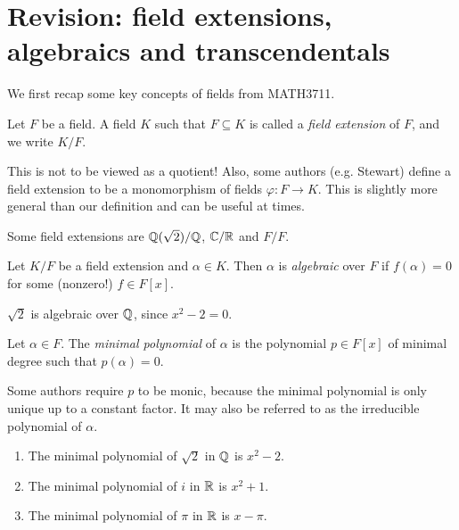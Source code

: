 \chapter{Revision: field extensions, algebraics and transcendentals}

We first recap some key concepts of fields from MATH3711.

\begin{definition}
    Let $F$ be a field. A field $K$ such that $F \subseteq K$ is called a \emph{field extension} of $F$, and we write $K/F$.
\end{definition}

\begin{remark}
    This is not to be viewed as a quotient! Also, some authors (e.g. Stewart) define a field extension to be a monomorphism of fields $\varphi: F \to K$. This is slightly more general than our definition and can be useful at times.
\end{remark}

\begin{example}
    Some field extensions are $\mathbb{{Q}}(\sqrt{2})/\mathbb{{Q}}$, $\mathbb{{C}}/\mathbb{{R}}$ and $F/F$.
\end{example}

\begin{definition}
    Let $K/F$ be a field extension and $\alpha \in K$. Then $\alpha$ is \emph{algebraic} over $F$ if $f(\alpha) = 0$ for some (nonzero!) $f \in F[x]$.
\end{definition}

\begin{example}
    $\sqrt{2}$ is algebraic over $\mathbb{{Q}}$, since $x^2 - 2 = 0$.
\end{example}

\begin{definition}
    Let $\alpha \in F$. The \emph{minimal polynomial} of $\alpha$ is the polynomial $p \in F[x]$ of minimal degree such that $p(\alpha) = 0$.
\end{definition}

\begin{remark}
    Some authors require $p$ to be monic, because the minimal polynomial is only unique up to a constant factor. It may also be referred to as the irreducible polynomial of $\alpha$.
\end{remark}

\begin{example}
    \begin{enumerate}
        \item The minimal polynomial of $\sqrt{2}$ in $\mathbb{{Q}}$ is $x^2 - 2$.
        \item The minimal polynomial of $i$ in $\mathbb{{R}}$ is $x^2 + 1$.
        \item The minimal polynomial of $\pi$ in $\mathbb{{R}}$ is $x - \pi$.
    \end{enumerate}
\end{example}


